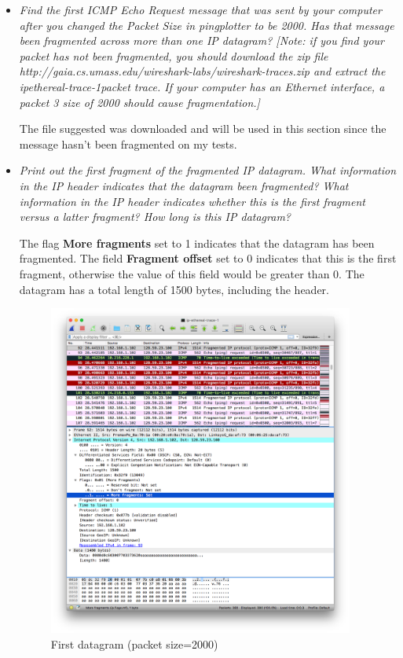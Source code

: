 \documentclass[11pt]{article}
\begin{document}
\begin{itemize}
	\setlength\itemsep{.5cm}

	\item
		\textit{Find the first ICMP Echo Request message that was sent by your computer after you
changed the Packet Size in pingplotter to be 2000. Has that message been fragmented across
more than one IP datagram? [Note: if you find your packet has not been fragmented, you
should download the zip file http://gaia.cs.umass.edu/wireshark-labs/wireshark-traces.zip and
 extract the ipethereal-trace-1packet trace. If your computer has an Ethernet interface, a packet 3
size of 2000 should cause fragmentation.]}
		\par The file suggested was downloaded and will be used in this section since the message hasn't been fragmented on my tests.

\pagebreak

	\item
		\textit{Print out the first fragment of the fragmented IP datagram. What information in the IP header indicates that the datagram been fragmented? What information in the IP header indicates whether this is the first fragment versus a latter fragment? How long is this IP datagram?}
		\par The flag \textbf{More fragments} set to 1 indicates that the datagram has been fragmented. The field \textbf{Fragment offset} set to 0 indicates that this is the first fragment, otherwise the value of this field would be greater than 0. The datagram has a total length of 1500 bytes, including the header.
		
		\begin{figure}[H]
		\centering
		\caption{First datagram (packet size=2000)}
		\includegraphics[width=380px]{02}
		\end{figure}
		

\end{itemize}
\end{document}
